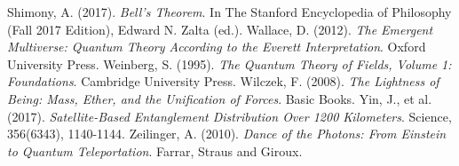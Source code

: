\documentclass[12pt,a4paper]{article}
\begin{document}
\begin{thebibliography}{99}
		 Shimony, A. (2017). \textit{Bell's Theorem}. In The Stanford Encyclopedia of Philosophy (Fall 2017 Edition), Edward N. Zalta (ed.).
		 Wallace, D. (2012). \textit{The Emergent Multiverse: Quantum Theory According to the Everett Interpretation}. Oxford University Press.
		 Weinberg, S. (1995). \textit{The Quantum Theory of Fields, Volume 1: Foundations}. Cambridge University Press.
		 Wilczek, F. (2008). \textit{The Lightness of Being: Mass, Ether, and the Unification of Forces}. Basic Books.
		 Yin, J., et al. (2017). \textit{Satellite-Based Entanglement Distribution Over 1200 Kilometers}. Science, 356(6343), 1140-1144.
		 Zeilinger, A. (2010). \textit{Dance of the Photons: From Einstein to Quantum Teleportation}. Farrar, Straus and Giroux.
	\end{thebibliography}
	
\end{document}
